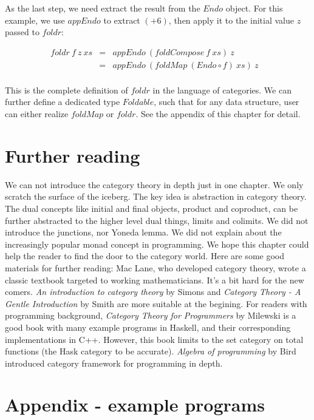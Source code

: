 \documentclass{article}
\begin{document}
As the last step, we need extract the result from the $Endo$ object. For this example, we use $appEndo$ to extract $(+6)$, then apply it to the initial value $z$ passed to $foldr$:

\[
\begin{array}{rcll}
foldr\ f\ z\ xs
  & = & appEndo\ (foldCompose\ f\ xs)\ z & \\
  & = & appEndo\ (foldMap\ (Endo \circ f)\ xs)\ z \\
\end{array}
\]

This is the complete definition of $foldr$ in the language of categories. We can further define a dedicated type $Foldable$, such that for any data structure, user can either realize $foldMap$ or $foldr$. See the appendix of this chapter for detail.

\section{Further reading}

We can not introduce the category theory in depth just in one chapter. We only scratch the surface of the iceberg. The key idea is abstraction in category theory. The dual concepts like initial and final objects, product and coproduct, can be further abstracted to the higher level dual things, limits and colimits. We did not introduce the junctions, nor Yoneda lemma. We did not explain about the increasingly popular monad concept in programming. We hope this chapter could help the reader to find the door to the category world. Here are some good materials for further reading: Mac Lane, who developed category theory, wrote a classic textbook\cite{Mac-Lane-1998} targeted to working mathematicians. It's a bit hard for the new comers. {\em An introduction to category theory} by Simons\cite{Simmons2011} and {\em Category Theory - A Gentle Introduction} by Smith are more suitable at the begining. For readers with programming background, {\em Category Theory for Programmers} by Milewski\cite{Milewski2018} is a good book with many example programs in Haskell, and their corresponding implementations in C++. However, this book limits to the set category on total functions (the Hask category to be accurate). {\em Algebra of programming} by Bird\cite{Bird97} introduced category framework for programming in depth.


\section{Appendix - example programs}
\end{document}
